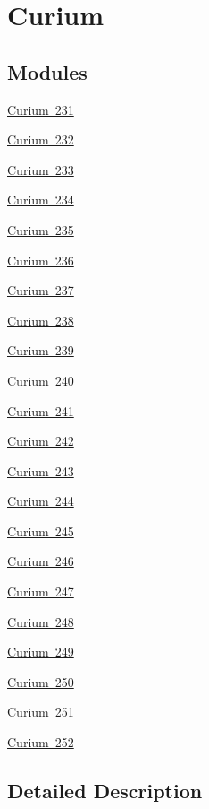 \hypertarget{group___isotope_const-_curium}{}\section{Curium}
\label{group___isotope_const-_curium}
\subsection*{Modules}
\begin{DoxyCompactItemize}
\item 
\mbox{\hyperlink{group___isotope_const-_curium-_cm231}{Curium 231}}
\item 
\mbox{\hyperlink{group___isotope_const-_curium-_cm232}{Curium 232}}
\item 
\mbox{\hyperlink{group___isotope_const-_curium-_cm233}{Curium 233}}
\item 
\mbox{\hyperlink{group___isotope_const-_curium-_cm234}{Curium 234}}
\item 
\mbox{\hyperlink{group___isotope_const-_curium-_cm235}{Curium 235}}
\item 
\mbox{\hyperlink{group___isotope_const-_curium-_cm236}{Curium 236}}
\item 
\mbox{\hyperlink{group___isotope_const-_curium-_cm237}{Curium 237}}
\item 
\mbox{\hyperlink{group___isotope_const-_curium-_cm238}{Curium 238}}
\item 
\mbox{\hyperlink{group___isotope_const-_curium-_cm239}{Curium 239}}
\item 
\mbox{\hyperlink{group___isotope_const-_curium-_cm240}{Curium 240}}
\item 
\mbox{\hyperlink{group___isotope_const-_curium-_cm241}{Curium 241}}
\item 
\mbox{\hyperlink{group___isotope_const-_curium-_cm242}{Curium 242}}
\item 
\mbox{\hyperlink{group___isotope_const-_curium-_cm243}{Curium 243}}
\item 
\mbox{\hyperlink{group___isotope_const-_curium-_cm244}{Curium 244}}
\item 
\mbox{\hyperlink{group___isotope_const-_curium-_cm245}{Curium 245}}
\item 
\mbox{\hyperlink{group___isotope_const-_curium-_cm246}{Curium 246}}
\item 
\mbox{\hyperlink{group___isotope_const-_curium-_cm247}{Curium 247}}
\item 
\mbox{\hyperlink{group___isotope_const-_curium-_cm248}{Curium 248}}
\item 
\mbox{\hyperlink{group___isotope_const-_curium-_cm249}{Curium 249}}
\item 
\mbox{\hyperlink{group___isotope_const-_curium-_cm250}{Curium 250}}
\item 
\mbox{\hyperlink{group___isotope_const-_curium-_cm251}{Curium 251}}
\item 
\mbox{\hyperlink{group___isotope_const-_curium-_cm252}{Curium 252}}
\end{DoxyCompactItemize}


\subsection{Detailed Description}
